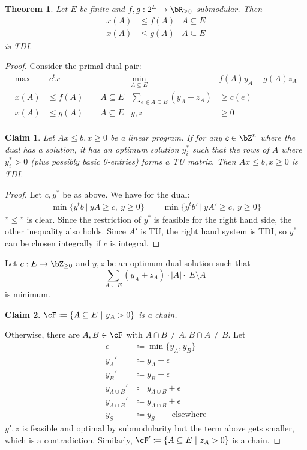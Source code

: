 \documentclass[11pt, a4paper]{article}
\newcommand{\abs}[1]{\left\lvert#1\right\rvert}
\newcommand{\set}[1]{\{#1\}}
\newtheorem{theorem}{Theorem}[section]
\newtheorem*{claim}{Claim}
\theoremstyle{remark}
\theoremstyle{definition}
\begin{document}
\begin{theorem}\label{thm:submodular-ineq-tdi}
	Let $E$ be finite and $f,g: 2^E\to\bR_{\geq0}$ submodular. Then
	\begin{align*}
		x(A) & \leq f(A) & A\subseteq E \\
		x(A) & \leq g(A) & A\subseteq E
	\end{align*}
	is TDI.
\end{theorem}
\begin{proof}
	Consider the primal-dual pair:
	\begin{align*}
		\max & \ c^tx                        & \min_{A\subseteq E}               & f(A)y_A + g(A)z_A \\
		x(A) & \leq f(A) \qquad A\subseteq E & \sum_{e\in A\subseteq E}(y_A+z_A) & \geq c(e)         \\
		x(A) & \leq g(A) \qquad A\subseteq E & y,z                               & \geq0             \\
	\end{align*}
	\begin{claim}
		Let $Ax\leq b, x\geq0$ be a linear program. If for any $c\in\bZ^n$ where
		the dual has a solution, it has an optimum solution $y_i^*$ such that the rows
		of $A$ where $y_i^*>0$ (plus possibly basic 0-entries)
		forms a TU matrix. Then $Ax\leq b, x\geq0$ is TDI.
	\end{claim}
	\begin{proof}
		Let $c,y^*$ be as above. We have for the dual:
		\begin{align*}
			\min\set{y^tb\ |\ yA\geq c,\ y\geq0} & =\min\set{y^tb'\ |\ yA'\geq c,\ y\geq0}
		\end{align*}
		''$\leq$'' is clear. Since the restriction of $y^*$ is feasible for the
		right hand side, the other inequality also holds. Since $A'$ is TU,
		the right hand system is TDI, so $y^*$ can be chosen integrally if $c$
		is integral.
	\end{proof}
	Let $c: E\to\bZ_{\geq0}$ and $y,z$ be an optimum dual solution such that
	\[\sum_{A\subseteq E}(y_A+z_A)\cdot\abs{A}\cdot\abs{E\setminus A}\]
	is minimum.
	\begin{claim}
		$\cF\coloneqq \set{A\subseteq E\ |\ y_A>0}$ is a chain.
	\end{claim}
	Otherwise, there are $A,B\in\cF$ with $A\cap B\neq A, B\cap A\neq B$. Let
	\begin{align*}
		\epsilon     & \coloneqq \min\set{y_A,y_B}          \\
		y_A'         & \coloneqq y_A-\epsilon               \\
		y_B'         & \coloneqq y_B-\epsilon               \\
		y_{A\cup B}' & \coloneqq y_{A\cup B}+\epsilon       \\
		y_{A\cap B}' & \coloneqq y_{A\cap B}+\epsilon \\
		y_S          & \coloneqq y_S \qquad\text{elsewhere}
	\end{align*}
	$y',z$ is feasible and optimal by submodularity but the term above gets
	smaller, which is a contradiction. Similarly, $\cF'\coloneqq \set{A\subseteq
			E\ |\ z_A>0}$ is a chain.


\end{proof}
\end{document}

